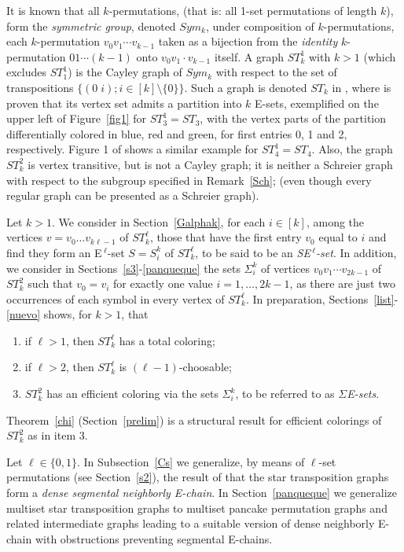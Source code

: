 \documentclass[12pt,reqno]{article}
\begin{document}
It is known that all $k$-permutations, (that is: all 1-set permutations of length $k$), form the {\it symmetric group}, denoted $Sym_k$, under composition of
$k$-permutations, each $k$-permutation $v_0v_1\cdots v_{k-1}$ taken as a bijection from the {\it identity} $k$-permutation $01\cdots(k-1)$ onto $v_0v_1\cdot v_{k-1}$ itself. 
A graph $ST^1_k$ with $k>1$ (which excludes $ST^1_1$) is the Cayley graph of $Sym_k$ with respect to the set of transpositions $\{(0\;i); i\in[k]\setminus\{0\}\}$.
Such a graph is denoted $ST_k$ in \cite{AK, D73}, where is proven that its vertex set admits a partition into $k$ E-sets, exemplified on the upper left of Figure~\ref{fig1}
for $ST^1_3=ST_3$, with the vertex parts of the partition differentially colored in blue, red and green, for first entries 0, 1 and 2, respectively. Figure 1 of \cite{D73} shows a similar example for $ST^1_4=ST_4$.
Also, the graph $ST^2_k$ is vertex transitive, but is not a Cayley graph; it is neither a Schreier graph with respect to the subgroup specified in Remark~\ref{Sch}; (even though every regular graph can be presented as a Schreier graph).

Let $k>1$. 
We consider in Section~\ref{Galphak},
for each $i\in[k]$, among the vertices $v=v_0\dots v_{k\ell -1}$ of $ST^\ell_k$, those that have the first entry $v_0$ equal to $i$ and find they form an E$\,^\ell$-set $S=S_i^k$ of $ST^\ell_k$, to be said to be an {\it SE$\,^\ell$-set}. In addition, we consider in Sections~\ref{s3}-\ref{panqueque} the sets $\Sigma_i^k$ of vertices $v_0v_1\cdots v_{2k-1}$ of $ST^2_k$ such that $v_0=v_i$ for exactly one value $i=1,\ldots,2k-1$, as there are just two occurrences of each symbol in every vertex of $ST^\ell_k$. 
In preparation, Sections~\ref{list}-\ref{nuevo} shows, for $k>1$, that
\begin{enumerate}\item if $\ell>1$, then $ST_k^\ell$ has a total coloring;
\item if $\ell>2$, then $ST_k^\ell$ is $(\ell-1)$-choosable; 
\item $ST_k^2$ has an efficient coloring via the sets $\Sigma_i^k$, to be referred to as {\it $\Sigma$E-sets}.
\end{enumerate} 
 Theorem~\ref{chi} (Section~\ref{prelim}) is a structural result for efficient colorings of $ST_k^2$ as in item 3.

Let $\ell\in\{0,1\}$. In Subsection~\ref{Cs} we generalize, by means of $\ell$-set permutations (see Section~\ref{s2}), the result of \cite{D73} that the star transposition graphs form a {\it dense segmental neighborly E-chain}. In Section~\ref{panqueque} we generalize multiset star transposition graphs to multiset pancake permutation graphs and related intermediate graphs \cite{D73} leading to a suitable version of dense neighborly E-chain with obstructions preventing segmental E-chains. 
\end{document}
